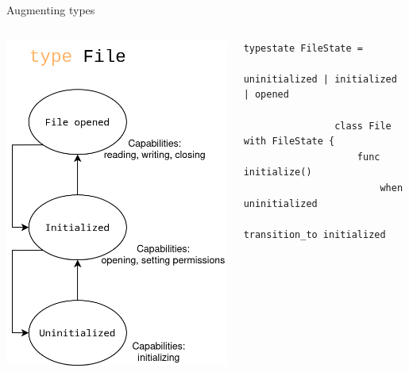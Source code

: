 \documentclass[compress,12pt,xcolor={dvipsnames}]{beamer}
\begin{document}
\begin{frame}[fragile]{Augmenting types}
    \begin{columns}
        \begin{column}{0.5\textwidth}
            \includegraphics[height=0.8\textheight]{typestate.png}
        \end{column}
        \begin{column}{0.5\textwidth}
            \begin{lstlisting}[language=TypeState,gobble=16,basicstyle=\tt\tiny]
                typestate FileState =
                    uninitialized | initialized | opened

                class File with FileState {
                    func initialize()
                        when uninitialized
                        transition_to initialized
                    

\end{lstlisting}
\end{column}
\end{columns}
\end{frame}
\end{document}
